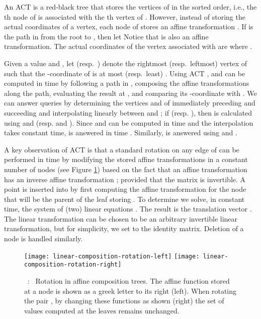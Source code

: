 \documentclass[11pt]{article}
\newcommand\myCaption[1]{\small\refstepcounter{figure}\figurename\ \thefigure :\ #1}
\begin{document}
An ACT  is a red-black tree that stores the vertices
of  in the sorted order, i.e., the th node of  is
associated with the th vertex of . However, instead of storing
the actual coordinates of a vertex, each node  of  stores
an affine transformation 
. 
If  is the path in  from the root
 to , then let 
Notice that  is also an affine transformation. 
The actual coordinates of the vertex associated with  are  where .

Given a value  and , let  (resp.\ ) denote the rightmost (resp.\ leftmost) vertex  of  such that the -coordinate of   is at most (resp.\ least) .
Using ACT ,  and  can be computed in  time by following a path in , composing the affine transformations along the path, evaluating the result at , and comparing its -coordinate with .
We can answer  queries by  determining the vertices  and  of  immediately preceding and succeeding  and interpolating  linearly between  and ; if  (resp. ), then  is calculated using  and  (resp.  and ). 
Since  and  can be computed in  time and the interpolation takes constant time,  is answered in time . Similarly,  is answered using  and .


A key observation of ACT is that a standard rotation on any edge of  can be performed in  time by modifying the stored affine transformations in a constant number of nodes (see Figure \ref{fig:rotation}) based on the fact that an affine transformation  has an inverse affine transformation ; provided that the matrix  is invertible.
A point  is inserted into  by first computing the affine transformation  for the node  that will be the parent of the leaf  storing .  To determine  we solve, in constant time, the system of (two) linear equations .  The result is the translation vector .  The linear transformation  can be chosen to be an arbitrary invertible linear transformation, but for simplicity, we set  to the identity matrix. Deletion of a node is handled similarly. 

\begin{figure}[b]
\begin{center}
\texttt{[image: linear-composition-rotation-left]}\qquad\qquad
\texttt{[image: linear-composition-rotation-right]}
\end{center}
\myCaption{\label{fig:rotation} Rotation in affine composition trees. The affine function stored at a node is shown as a greek letter to its right (left). When rotating the pair , by changing these functions as shown (right) the set of values computed at the leaves remains unchanged. }
\end{figure}
\end{document}
